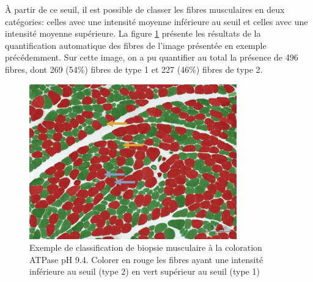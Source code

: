 À partir de ce seuil, il est  possible de classer les fibres musculaires en deux catégories: celles avec une intensité moyenne inférieure au seuil et celles avec une intensité moyenne supérieure. La figure \ref{fig:apt_paint} présente les résultats de la quantification automatique des fibres de l'image présentée en exemple précédemment. Sur cette image, on a pu quantifier au total la présence de 496 fibres, dont 269 (54\%) fibres de type 1 et 227 (46\%) fibres de type 2. 
\begin{figure}[!ht]
 \centering
 \includegraphics[width=0.8\textwidth]{figures/atp_paint.png}
 \caption[Exemple de classification de biopsie musculaire à la coloration ATPase pH 9.4]{Exemple de classification de biopsie musculaire à la coloration ATPase pH 9.4. Colorer en rouge les fibres ayant une intensité inférieure au seuil (type 2) en vert supérieur au seuil (type 1)}
 \label{fig:apt_paint}
\end{figure}

